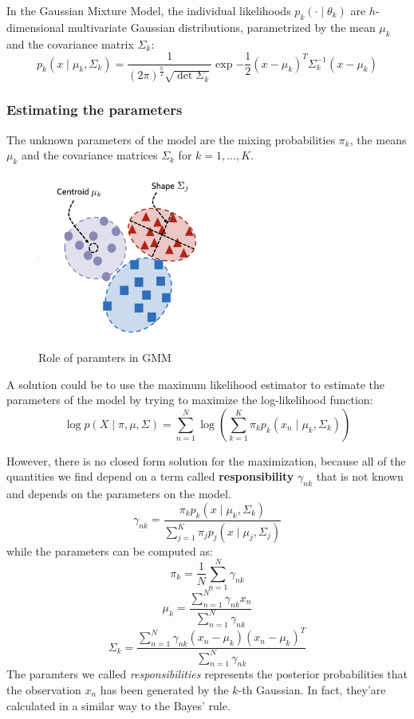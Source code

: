 In the Gaussian Mixture Model, the individual likelihoods $p_k(\cdot \mid \theta_k)$ are $h$-dimensional multivariate Gaussian distributions, parametrized by the mean $\mu_k$ and the covariance matrix $\Sigma_k$:
\[
    p_k(x \mid \mu_k, \Sigma_k) = \frac{1}{(2\pi)^{\frac{h}{2}} \sqrt{\det \Sigma_k}} \exp{-\frac{1}{2}(x-\mu_k)^T \Sigma_k^{-1} (x-\mu_k)}
\]

\subsubsection*{Estimating the parameters}
The unknown parameters of the model are the mixing probabilities $\pi_k$, the means $\mu_k$ and the covariance matrices $\Sigma_k$ for $k=1, \ldots, K$.

\begin{figure}
    \centering
    \includegraphics[width=0.5\textwidth]{./figures/chapter_7/gmmparam.png}
    \caption{Role of paramters in GMM}
    \label{fig:gmmparam}
\end{figure}

A solution could be to use the maximum likelihood estimator to estimate the parameters of the model by trying to maximize the log-likelihood function:
\[
    \log p(X \mid \pi, \mu, \Sigma) = \sum_{n=1}^{N} \log \left( \sum_{k=1}^{K} \pi_k p_k(x_n \mid \mu_k, \Sigma_k) \right)
\]

However, there is no closed form solution for the maximization, because all of the quantities we find depend on a term called \textbf{responsibility} $\gamma_{nk}$ that is not known and depends on the parameters on the model.
\[
    \gamma_{nk} = \frac{\pi_k p_k(x \mid \mu_k, \Sigma_k)}{\sum_{j=1}^{K} \pi_j p_j(x \mid \mu_j, \Sigma_j)}
\]
while the parameters can be computed as:
\[
    \pi_k = \frac{1}{N} \sum_{n=1}^{N} \gamma_{nk}
\]
\[
    \mu_k = \frac{\sum_{n=1}^{N} \gamma_{nk} x_n}{\sum_{n=1}^{N} \gamma_{nk}}
\]
\[
    \Sigma_k = \frac{\sum_{n=1}^{N} \gamma_{nk} (x_n - \mu_k)(x_n - \mu_k)^T}{\sum_{n=1}^{N} \gamma_{nk}}
\]
The paramters we called \textit{responsibilities} represents the posterior probabilities that the observation $x_n$ has been generated by the $k$-th Gaussian. In fact, they'are calculated in a similar way to the Bayes' rule.

